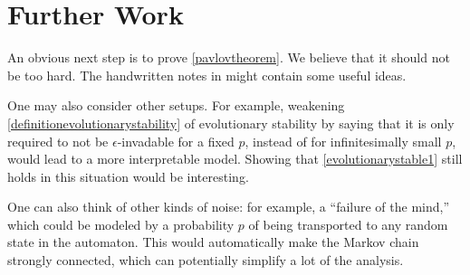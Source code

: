 \documentclass[12pt]{article}
\theoremstyle{definition}
\newtheorem{lemma}[theorem]{Lemma}
\theoremstyle{remark}
\begin{document}
    \section{Further Work}
    \label{sectiondiscussion}

    An obvious next step is to prove \cref{pavlovtheorem}. We believe that it should not be too hard. The handwritten notes in \cite{arvid2020} might contain some useful ideas.

    One may also consider other setups. For example, weakening \cref{definitionevolutionarystability} of evolutionary stability by saying that it is only required to not be $\epsilon$-invadable for a fixed $p$, instead of for infinitesimally small $p$, would lead to a more interpretable model. Showing that \cref{evolutionarystable1} still holds in this situation would be interesting.
    
    One can also think of other kinds of noise: for example, a ``failure of the mind,'' which could be modeled by a probability $p$ of being transported to any random state in the automaton. This would automatically make the Markov chain strongly connected, which can potentially simplify a lot of the analysis.







\end{document}
